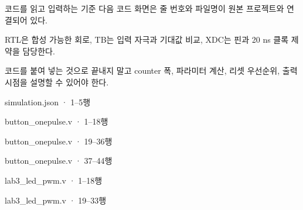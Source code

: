 \begin{frame}[label=code]{코드를 읽고 입력하는 기준}
\small
다음 코드 화면은 줄 번호와 파일명이 원본 프로젝트와 연결되어 있다.\par\vspace{0.25cm}
RTL은 합성 가능한 회로, TB는 입력 자극과 기대값 비교, XDC는 핀과 20 ns 클록 제약을 담당한다.\par\vspace{0.25cm}
코드를 붙여 넣는 것으로 끝내지 말고 counter 폭, 파라미터 계산, 리셋 우선순위, 출력 시점을 설명할 수 있어야 한다.
\end{frame}

\begin{frame}[fragile]{simulation.json · 1–5행}

\end{frame}

\begin{frame}[fragile]{button\_onepulse.v · 1–18행}

\end{frame}

\begin{frame}[fragile]{button\_onepulse.v · 19–36행}

\end{frame}

\begin{frame}[fragile]{button\_onepulse.v · 37–44행}

\end{frame}

\begin{frame}[fragile]{lab3\_led\_pwm.v · 1–18행}

\end{frame}

\begin{frame}[fragile]{lab3\_led\_pwm.v · 19–33행}

\end{frame}

